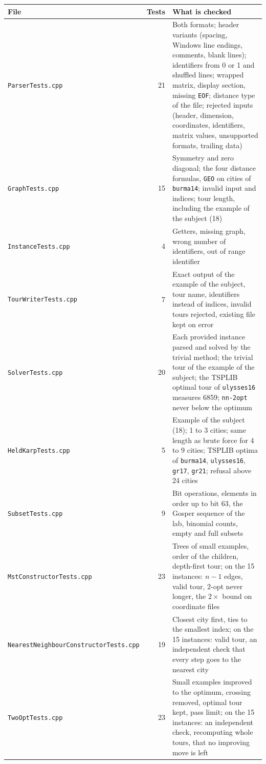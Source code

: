 \documentclass[10pt,a4paper]{article}
\begin{document}
\begin{table}[H]
\centering\footnotesize
\begin{tabularx}{\linewidth}{@{}L{5.6cm} r Y@{}}
\toprule
File & Tests & What is checked \\
\midrule
\texttt{ParserTests.cpp} & 21 & Both formats; header variants (spacing, Windows line endings, comments, blank lines); identifiers from 0 or 1 and shuffled lines; wrapped matrix, display section, missing \texttt{EOF}; distance type of the file; rejected inputs (header, dimension, coordinates, identifiers, matrix values, unsupported formats, trailing data) \\
\texttt{GraphTests.cpp} & 15 & Symmetry and zero diagonal; the four distance formulas, \texttt{GEO} on cities of \texttt{burma14}; invalid input and indices; tour length, including the example of the subject (18) \\
\texttt{InstanceTests.cpp} & 4 & Getters, missing graph, wrong number of identifiers, out of range identifier \\
\texttt{TourWriterTests.cpp} & 7 & Exact output of the example of the subject, tour name, identifiers instead of indices, invalid tours rejected, existing file kept on error \\
\texttt{SolverTests.cpp} & 20 & Each provided instance parsed and solved by the trivial method; the trivial tour of the example of the subject; the TSPLIB optimal tour of \texttt{ulysses16} measures 6859; \texttt{nn-2opt} never below the optimum \\
\texttt{HeldKarpTests.cpp} & 5 & Example of the subject (18); 1 to 3 cities; same length as brute force for 4 to 9 cities; TSPLIB optima of \texttt{burma14}, \texttt{ulysses16}, \texttt{gr17}, \texttt{gr21}; refusal above 24 cities \\
\texttt{SubsetTests.cpp} & 9 & Bit operations, elements in order up to bit 63, the Gosper sequence of the lab, binomial counts, empty and full subsets \\
\texttt{MstConstructorTests.cpp} & 23 & Trees of small examples, order of the children, depth-first tour; on the 15 instances: $n-1$ edges, valid tour, 2-opt never longer, the $2\times$ bound on coordinate files \\
\texttt{NearestNeighbourConstructorTests.cpp} & 19 & Closest city first, ties to the smallest index; on the 15 instances: valid tour, an independent check that every step goes to the nearest city \\
\texttt{TwoOptTests.cpp} & 23 & Small examples improved to the optimum, crossing removed, optimal tour kept, pass limit; on the 15 instances: an independent check, recomputing whole tours, that no improving move is left \\

\end{tabularx}
\end{table}
\end{document}
